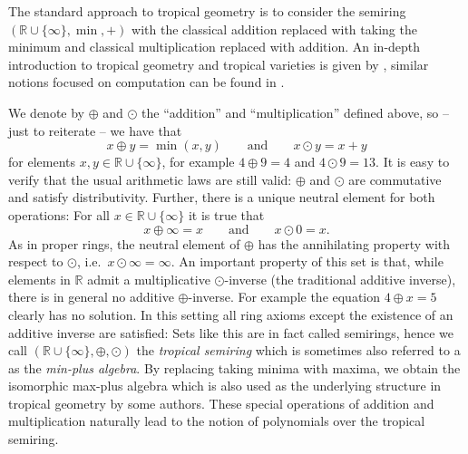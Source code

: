 \documentclass[
  paper=a4,
  DIV=14,
  fontsize=12pt,
  titlepage,
  bibliography=totoc,
  listof=totoc,
  pagesize=pdftex
]{scrartcl}
\numberwithin{figure}{section}
\numberwithin{equation}{section}
\numberwithin{table}{section}
\newcommand*\setR{\mathds{R}}
\theoremstyle{definition}
\numberwithin{definition}{section}
\begin{document}
The standard approach to tropical geometry is to consider the semiring $(\setR \cup
\{\infty\}, \min, +)$ with the classical addition replaced with taking the minimum and
classical multiplication replaced with addition. An in-depth introduction to tropical
geometry and tropical varieties is given by \cite{sturmMacTrop}, similar notions focused
on computation can be found in \cite{compTropVar}.

We denote by $\oplus$ and $\odot$ the \enquote{addition} and \enquote{multiplication}
defined above, so -- just to reiterate -- we have that
\[
  x \oplus y = \min(x,y)
  \qquad \text{and} \qquad
  x \odot y = x+y
\]
for elements $x,y\in \setR\cup\{\infty\}$, for example $4\oplus9 = 4$ and $4\odot9 = 13$.
It is easy to verify that the usual arithmetic laws are still valid: $\oplus$ and $\odot$
are commutative and satisfy distributivity. Further, there is a unique neutral  element
for both operations: For all $x\in \setR\cup \{\infty\}$ it is true that
\[
  x \oplus \infty = x
  \qquad \text{and} \qquad
  x \odot 0 = x.
\]
As in proper rings, the neutral element of $\oplus$ has the annihilating property with
respect to $\odot$, i.e.\ $x\odot \infty = \infty$. An important property of this set is
that, while elements in $\setR$ admit a multiplicative $\odot$-inverse (the traditional
additive inverse), there is in general no additive $\oplus$-inverse. For example the
equation $4\oplus x = 5$ clearly has no solution. In this setting all ring axioms except
the existence of an additive inverse are satisfied: Sets like this are in fact called
semirings, hence we call $(\setR\cup \{\infty\}, \oplus, \odot)$ the \emph{tropical
semiring} which is sometimes also referred to a as the \emph{min-plus algebra}. By
replacing taking minima with maxima, we obtain the isomorphic max-plus algebra which is
also used as the underlying structure in tropical geometry by some authors. These special
operations of addition and multiplication naturally lead to the notion of polynomials over
the tropical semiring.
\end{document}
